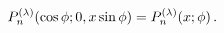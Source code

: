\[\mathop{P^{(\lambda)}_{n}\/}\nolimits\!\left(\mathop{\cos\/}\nolimits\phi;0,x%
\mathop{\sin\/}\nolimits\phi\right)=\mathop{P^{(\lambda)}_{n}\/}\nolimits\!%
\left(x;\phi\right).\]